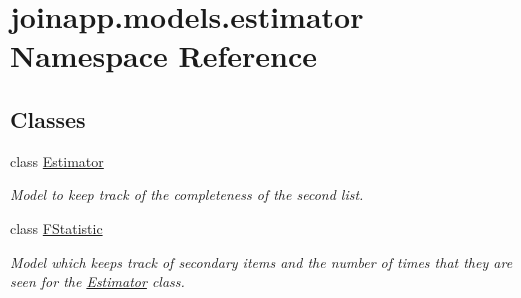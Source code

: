 \hypertarget{namespacejoinapp_1_1models_1_1estimator}{}\section{joinapp.\+models.\+estimator Namespace Reference}
\label{namespacejoinapp_1_1models_1_1estimator}
\subsection*{Classes}
\begin{DoxyCompactItemize}
\item 
class \mbox{\hyperlink{classjoinapp_1_1models_1_1estimator_1_1_estimator}{Estimator}}
\begin{DoxyCompactList}\small\item\em Model to keep track of the completeness of the second list. \end{DoxyCompactList}\item 
class \mbox{\hyperlink{classjoinapp_1_1models_1_1estimator_1_1_f_statistic}{F\+Statistic}}
\begin{DoxyCompactList}\small\item\em Model which keeps track of secondary items and the number of times that they are seen for the \mbox{\hyperlink{classjoinapp_1_1models_1_1estimator_1_1_estimator}{Estimator}} class. \end{DoxyCompactList}\end{DoxyCompactItemize}
